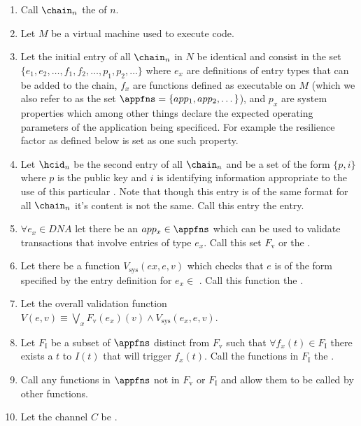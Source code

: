 \documentclass[twocolumn,showpacs,
  nofootinbib,aps,superscriptaddress,
  eqsecnum,prd,notitlepage,showkeys,10pt]{revtex4-1}
\begin{document}
\begin{enumerate}

\item Call $\chain_n$ the  of $n$.

\item Let $M$ be a virtual machine used to execute code.

\item Let the initial entry of all $\chain_n$ in $N$ be identical and consist in the set \hcdna $\{e_1,e_2,\dots,f_1,f_2,\dots,p_1,p_2,\dots\}$ where $e_x$ are definitions of entry types that can be added to the chain, $f_x$ are functions defined as executable on $M$ (which we also refer to as the set $\appfns = \{app_1,app_2,\dots\}$), and $p_x$ are  system properties which among other things declare the expected operating parameters of the application being specificed.  For example the resilience factor as defined below is set as one such property.

\item Let $\hcid_n$ be the second entry of all $\chain_n$ and be a set of the form $\{p,i\}$ where $p$ is the public key and $i$ is identifying information appropriate to the use of this particular \shc. Note that though this entry is of the same format for all $\chain_n$ it's content is not the same. Call this entry the  entry.

\item $\forall e_x \in DNA$ let there be an $app_x \in \appfns$ which can be used to validate transactions that involve entries of type $e_x$.  Call this set $F_\mathrm{v}$ or the .

\item Let there be a function $V_\mathrm{sys}(ex,e,v)$ which checks that $e$ is of the form specified by the entry definition for $e_x \in$ \hcdna.  Call this function the .

\item Let the overall validation function $V(e,v) \equiv \bigvee_x  F_\mathrm{v}(e_x)(v) \wedge V_\mathrm{sys}(e_x,e,v)$.

\item Let $F_\mathrm{I}$ be a subset of $\appfns$ distinct from $F_\mathrm{v}$ such that $\forall f_x(t) \in F_\mathrm{I}$ there exists a $t$ to $I(t)$ that will trigger $f_x(t)$. Call the functions in $F_\mathrm{I}$ the .

\item Call any functions in $\appfns$ not in $F_\mathrm{v}$ or $F_\mathrm{I}$  and allow them to be called by other functions.
\item Let the channel $C$ be .


\end{enumerate}
\end{document}
